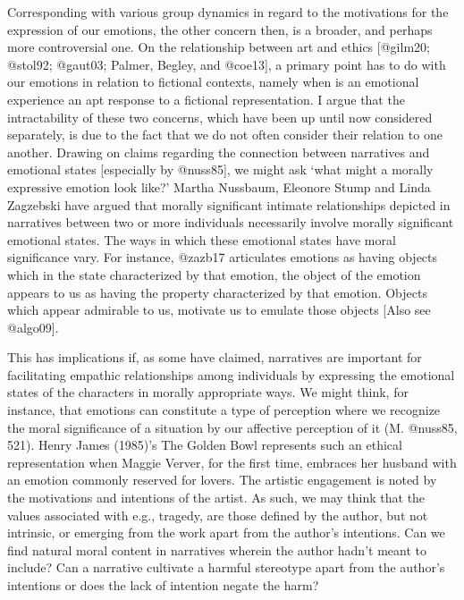 \documentclass[
  letterpaper,
  DIV=11,
  numbers=noendperiod]{scrartcl}
\theoremstyle{remark}
\begin{document}
Corresponding with various group dynamics in regard to the motivations
for the expression of our emotions, the other concern then, is a
broader, and perhaps more controversial one. On the relationship between
art and ethics {[}@gilm20; @stol92; @gaut03; Palmer, Begley, and
@coe13{]}, a primary point has to do with our emotions in relation to
fictional contexts, namely when is an emotional experience an apt
response to a fictional representation. I argue that the intractability
of these two concerns, which have been up until now considered
separately, is due to the fact that we do not often consider their
relation to one another. Drawing on claims regarding the connection
between narratives and emotional states {[}especially by @nuss85{]}, we
might ask `what might a morally expressive emotion look like?' Martha
Nussbaum, Eleonore Stump and Linda Zagzebski have argued that morally
significant intimate relationships depicted in narratives between two or
more individuals necessarily involve morally significant emotional
states. The ways in which these emotional states have moral significance
vary. For instance, @zazb17 articulates emotions as having objects which
in the state characterized by that emotion, the object of the emotion
appears to us as having the property characterized by that emotion.
Objects which appear admirable to us, motivate us to emulate those
objects {[}Also see @algo09{]}.

This has implications if, as some have claimed, narratives are important
for facilitating empathic relationships among individuals by expressing
the emotional states of the characters in morally appropriate ways. We
might think, for instance, that emotions can constitute a type of
perception where we recognize the moral significance of a situation by
our affective perception of it (M. @nuss85, 521). Henry James (1985)'s
The Golden Bowl represents such an ethical representation when Maggie
Verver, for the first time, embraces her husband with an emotion
commonly reserved for lovers. The artistic engagement is noted by the
motivations and intentions of the artist. As such, we may think that the
values associated with e.g., tragedy, are those defined by the author,
but not intrinsic, or emerging from the work apart from the author's
intentions. Can we find natural moral content in narratives wherein the
author hadn't meant to include? Can a narrative cultivate a harmful
stereotype apart from the author's intentions or does the lack of
intention negate the harm?
\end{document}
